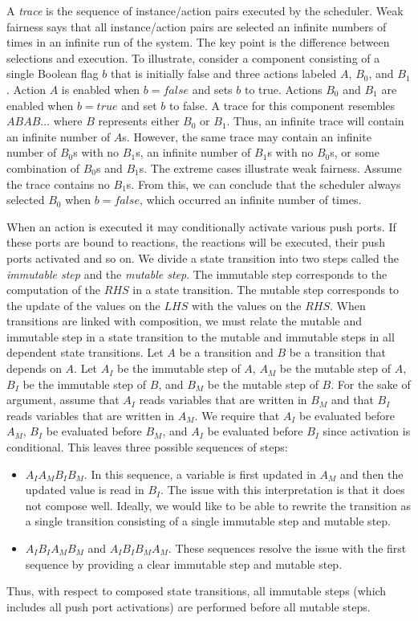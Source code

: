 A \emph{trace} is the sequence of instance/action pairs executed by the scheduler.
Weak fairness says that all instance/action pairs are selected an infinite numbers of times in an infinite run of the system.
The key point is the difference between selections and execution.
To illustrate, consider a component consisting of a single Boolean flag $b$ that is initially false and three actions labeled $A$, $B_0$, and $B_1$.
Action $A$ is enabled when $b = false$ and sets $b$ to true.
Actions $B_0$ and $B_1$ are enabled when $b = true$ and set $b$ to false.
A trace for this component resembles $ABAB \ldots$ where $B$ represents either $B_0$ or $B_1$.
Thus, an infinite trace will contain an infinite number of $A$s.
However, the same trace may contain an infinite number of $B_0$s with no $B_1$s, an infinite number of $B_1$s with no $B_0$s, or some combination of $B_0$s and $B_1$s.
The extreme cases illustrate weak fairness.
Assume the trace contains no $B_1$s.
From this, we can conclude that the scheduler always selected $B_0$ when $b = false$, which occurred an infinite number of times.

When an action is executed it may conditionally activate various push ports.
If these ports are bound to reactions, the reactions will be executed, their push ports activated and so on.
We divide a state transition into two steps called the \emph{immutable step} and the \emph{mutable step}.
The immutable step corresponds to the computation of the $RHS$ in a state transition.
The mutable step corresponds to the update of the values on the $LHS$ with the values on the $RHS$.
When transitions are linked with composition, we must relate the mutable and immutable step in a state transition to the mutable and immutable steps in all dependent state transitions.
Let $A$ be a transition and $B$ be a transition that depends on $A$.
Let $A_I$ be the immutable step of $A$, $A_M$ be the mutable step of $A$, $B_I$ be the immutable step of $B$, and $B_M$ be the mutable step of $B$.
For the sake of argument, assume that $A_I$ reads variables that are written in $B_M$ and that $B_I$ reads variables that are written in $A_M$.
We require that $A_I$ be evaluated before $A_M$, $B_I$ be evaluated before $B_M$, and $A_I$ be evaluated before $B_I$ since activation is conditional.
This leaves three possible sequences of steps:
\begin{itemize}
\item $A_I A_M B_I B_M$.  In this sequence, a variable is first updated in $A_M$ and then the updated value is read in $B_I$.  The issue with this interpretation is that it does not compose well.  Ideally, we would like to be able to rewrite the transition as a single transition consisting of a single immutable step and mutable step.
\item $A_I B_I A_M B_M$ and $A_I B_I B_M A_M$.  These sequences resolve the issue with the first sequence by providing a clear immutable step and mutable step.
\end{itemize}
Thus, with respect to composed state transitions, all immutable steps (which includes all push port activations) are performed before all mutable steps.

